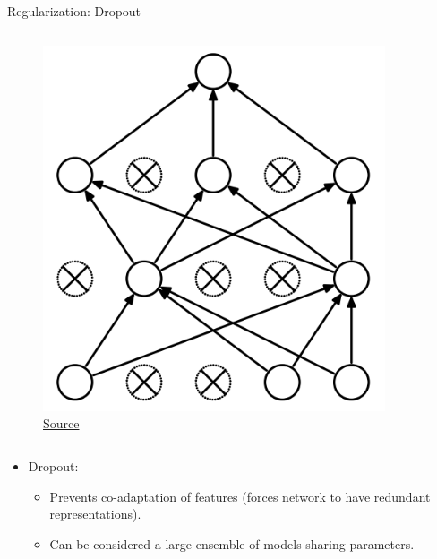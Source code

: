 \begin{frame}{Regularization: Dropout}
\begin{clomuns}
\begin{column}{0.4\textwidth}
\centering
\begin{figure}[H]
	\centering
	\includegraphics[width=0.9\textwidth]{Figs/Dropout-after.png}
	\caption{\href{https://www.cs.toronto.edu/~hinton/absps/JMLRdropout.pdf}{Source}}
\end{figure}
\end{column}
\begin{column}{0.4\textwidth}
\centering
\begin{itemize}
	\item Dropout:
	\begin{itemize}
		\item Prevents co-adaptation of features (forces network to have redundant representations).
		\item Can be considered a large ensemble of models sharing parameters.
	\end{itemize}
\end{itemize}
\end{column}
\end{clomuns}

\end{frame}
